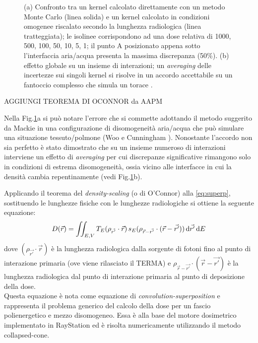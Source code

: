 {\begin{figure}[!t]
\caption{(a) Confronto tra un kernel calcolato direttamente con un metodo Monte Carlo (linea solida) e un kernel calcolato in condizioni omogenee riscalato secondo la lunghezza radiologica (linea tratteggiata); le isolinee corrispondono ad una dose relativa di 1000, 500, 100, 50, 10, 5, 1; il punto A posizionato appena sotto l'interfaccia aria/acqua presenta la massima discrepanza (50\%). (b) effetto globale su un insieme di interazioni; un \textit{averaging} delle incertezze sui singoli kernel si risolve in un accordo accettabile su un fantoccio complesso che simula un torace \cite{Woo1990,Arnfield2000,Ahnesjo1989}.}
\label{fig:kern_dens}
\end{figure}



AGGIUNGI TEOREMA DI OCONNOR da AAPM

Nella Fig.\ref{fig:kern_dens}a si può notare l'errore che si commette adottando il metodo suggerito da Mackie in una configurazione di disomogeneità aria/acqua che può simulare una situazione tessuto/polmone (Woo e Cunningham \cite{Woo1990}). Nonostante l'accordo non sia perfetto è stato dimostrato \cite{Ahnesjo1989} che su un insieme numeroso di interazioni interviene un effetto di \textit{averaging} per cui discrepanze significative rimangono solo in condizioni di estrema disomogeneità, ossia vicino alle interfacce in cui la densità cambia repentinamente (vedi Fig.\ref{fig:kern_dens}b).



Applicando il teorema del \textit{density-scaling} (o di O'Connor) alla \eqref{eq:superp}, sostituendo le lunghezze fisiche con le lunghezze radiologiche \cite{Khan2010} si ottiene la seguente equazione:
\begin{equation}
D(\vec{r}) = \iint_{E,V} T_E(\rho_{\vec{r'}} \cdot \vec{r})\, s_E(\rho_{\vec{r}-\vec{r'}}\cdot (\vec{r}-\vec{r'}))\,\text{d}\vec{r'} \,\text{d} E
\label{eq:superp_disom}
\end{equation}
dove $(\rho_{\vec{r'}} \cdot \vec{r})$ è la lunghezza radiologica dalla sorgente di fotoni fino al punto di interazione primaria (ove viene rilasciato il TERMA) e $\rho_{\vec{r}-\vec{r'}}\cdot (\vec{r}-\vec{r'})$ è la lunghezza radiologica dal punto di interazione primaria al punto di deposizione della dose.\\
Questa equazione è nota come equazione di \textit{convolution-superposition} e rappresenta il problema generico del calcolo della dose per un fascio polienergetico e mezzo disomogeneo. Essa è alla base del motore dosimetrico implementato in RayStation ed è risolta numericamente utilizzando il metodo collapsed-cone.

}
